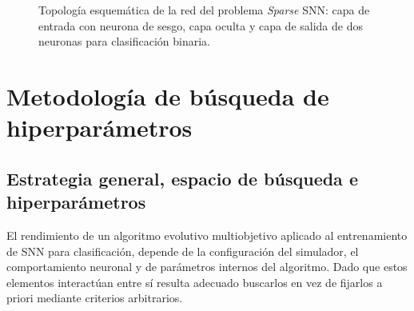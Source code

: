 \begin{figure}[htbp]
\centering
{}
\caption{Topología esquemática de la red del problema \textit{Sparse} SNN: capa de entrada con neurona de sesgo, capa oculta y capa de salida de dos neuronas para clasificación binaria.}
\label{fig:topologia-sparse-snn}
\end{figure}

\section{Metodología de búsqueda de hiperparámetros}\label{sec:metodologia_busqueda_hiper}
\subsection{Estrategia general, espacio de búsqueda e hiperparámetros}\label{subsec:estrategia_opti_externa}
El rendimiento de un algoritmo evolutivo multiobjetivo aplicado al entrenamiento de SNN para clasificación, depende de la configuración del simulador, el comportamiento neuronal y de parámetros internos del algoritmo. Dado que estos elementos interactúan entre sí resulta adecuado buscarlos en vez de fijarlos a priori mediante criterios arbitrarios.

